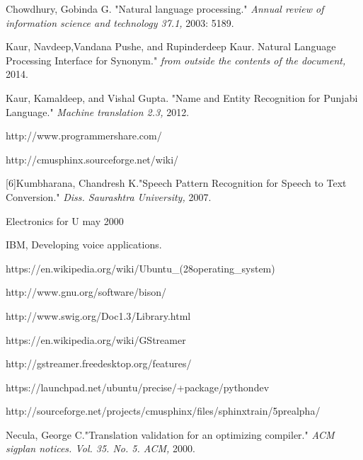 \documentclass[12pt,a4paper,oldfontcommands]{memoir}
\begin{document}


%
%



\begin{thebibliography}{9}

Chowdhury, Gobinda G. 
"Natural language processing."
\textit{Annual review of information science and technology 37.1,} 2003: 5189.

Kaur, Navdeep,Vandana Pushe, and Rupinderdeep Kaur.
Natural Language Processing Interface for Synonym."
\textit{from outside the contents of the document,} 2014.

Kaur, Kamaldeep, and Vishal Gupta.
"Name and Entity Recognition for Punjabi Language."
\textit{Machine translation 2.3,} 2012.

http://www.programmershare.com/

http://cmusphinx.sourceforge.net/wiki/

[6]Kumbharana, Chandresh K."Speech Pattern Recognition for Speech to Text Conversion."
\textit{Diss. Saurashtra University,} 2007.

 Electronics for U may 2000

IBM, Developing voice applications.

 https://en.wikipedia.org/wiki/Ubuntu\_(28operating\_system)
\textit{}

http://www.gnu.org/software/bison/
\textit{}

http://www.swig.org/Doc1.3/Library.html
\textit{}

https://en.wikipedia.org/wiki/GStreamer
\textit{}

http://gstreamer.freedesktop.org/features/
\textit{}

https://launchpad.net/ubuntu/precise/+package/pythondev
\textit{}

http://sourceforge.net/projects/cmusphinx/files/sphinxtrain/5prealpha/
\textit{}

Necula, George C."Translation validation for an optimizing compiler."
\textit{ACM sigplan notices. Vol. 35. No. 5. ACM,} 2000.


\end{thebibliography}
\end{document}
